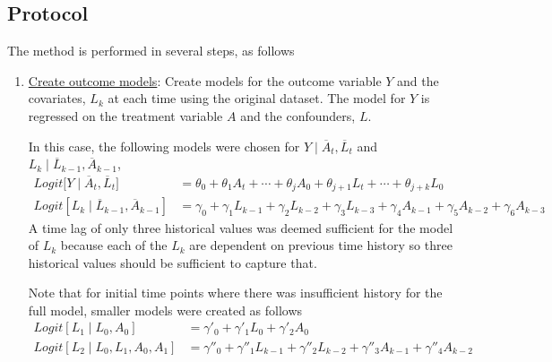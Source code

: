 
\subsection{Protocol} 
The method is performed in several steps, as follows 
\begin{enumerate}  

\item \underline{Create outcome models}: Create models for the outcome variable $Y$ and the covariates, $L_k$ at each time using the original dataset.  The model for $Y$ is regressed on the treatment variable $A$ and the confounders, $L$. 

In this case, the following models were chosen for $Y \mid  \overline{A}_t, \overline{L}_t$ and $L_k \mid \overline{L}_{k-1}, \overline{A}_{k-1}$, 
\begin{align} 
Logit \big[Y \mid \overline{A}_t, \overline{L}_t \big] &= \theta_{0} + \theta_1 A_{t} + \cdots + \theta_j A_0 + \theta_{j+1} L_t + \cdots + \theta_{j+k} L_0 \label{eq:4} \\ 
Logit[L_k \mid \overline{L}_{k-1}, \overline{A}_{k-1}] &= \gamma_0 + \gamma_1 L_{k-1} + \gamma_2 L_{k-2} + \gamma_3 L_{k-3}  + \gamma_4 A_{k-1} + \gamma_5 A_{k-2} + \gamma_6 A_{k-3} \label{eq:5} 
\end{align} 
A time lag of only three historical values was deemed sufficient for the model of $L_k$ because each of the $L_k$ are dependent on previous time history so three historical values should be sufficient to capture that. 


Note that for initial time points where there was insufficient history for the full model, smaller models were created as follows 
\begin{align} 
Logit[L_1 \mid L_0, A_0]  &= \gamma'_0 + \gamma'_1 L_0 +  \gamma'_2 A_0 \label{eq:6} \\
Logit[L_2 \mid L_0, L_1, A_0, A_1] &= \gamma''_0 + \gamma''_1 L_{k-1} + \gamma''_2 L_{k-2}   + \gamma''_3 A_{k-1} + \gamma''_4 A_{k-2} \label{eq:7}
\end{align}



\end{enumerate}
